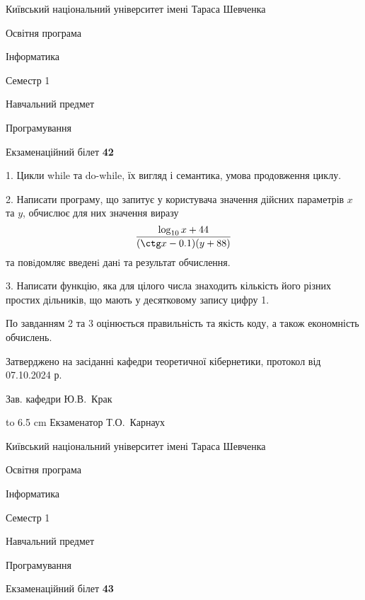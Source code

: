 \documentclass[12pt, ukrainian]{article}
\begin{document}
{{\begin {scriptsize}\par
{ \center  Київський національний університет імені Тараса Шевченка \par}
{\parbox {5 cm}{Освітня програма \hfill}{\parbox {7 cm}{Інформатика\hfill}}\parbox {6 cm}{\hfill Семестр 1}}\par
{\parbox {5 cm} {Навчальний предмет \hfill}\parbox {7 cm}{Програмування \hfill}\parbox {6cm}{\hfill}\par}\vspace{-15pt} \end{scriptsize}}{\center Екзаменаційний білет \No \textbf { 42 }\par}}
{%
1. Цикли while та do-while, їх вигляд і семантика, умова продовження циклу.%
\par
2. Написати програму, що запитує у користувача значення дійсних параметрів $x$ та $y$, обчислює для них значення виразу 
$$\frac{\log_{10} x + 44}{(\ctg x - 0.1) (y + 88)}$$ 
та повiдомляє введенi данi та результат обчислення.

\par
3. Написати функцію, яка для цілого числа знаходить кількість його різних простих дільників, що мають у десятковому запису цифру 1.

По завданням 2 та 3 оцінюється правильність та якість коду, а також економність обчислень.

}
{\smallskip\smallskip \begin {scriptsize} Затверджено на засіданні кафедри теоретичної кібернетики, протокол   від   07.10.2024 р.\par\smallskip\smallskip\smallskip\smallskip
{\parbox {6.5 cm} {Зав. кафедри \dotfill Ю.В.~Крак}}\hspace {0.7cm} {\hbox to 6.5 cm { Екзаменатор \dotfill Т.О.~Карнаух}} \end{scriptsize}}
\newpage
{{\begin {scriptsize}\par
{ \center  Київський національний університет імені Тараса Шевченка \par}
{\parbox {5 cm}{Освітня програма \hfill}{\parbox {7 cm}{Інформатика\hfill}}\parbox {6 cm}{\hfill Семестр 1}}\par
{\parbox {5 cm} {Навчальний предмет \hfill}\parbox {7 cm}{Програмування \hfill}\parbox {6cm}{\hfill}\par}\vspace{-15pt} \end{scriptsize}}{\center Екзаменаційний білет \No \textbf { 43 }\par}}
\end{document}
